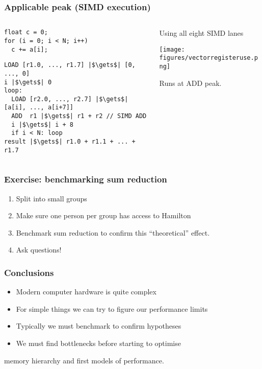 \documentclass[dvipsnames,presentation,aspectratio=169,14pt]{beamer}
\begin{document}
\begin{frame}[fragile]
  \frametitle{Applicable peak (SIMD execution)}
  \begin{columns}
    \begin{column}{0.6\textwidth}\small

\begin{verbatim}
float c = 0;
for (i = 0; i < N; i++)
  c += a[i];
\end{verbatim}


\begin{verbatim}
LOAD [r1.0, ..., r1.7] |$\gets$| [0, ..., 0]
i |$\gets$| 0
loop:
  LOAD [r2.0, ..., r2.7] |$\gets$| [a[i], ..., a[i+7]]
  ADD  r1 |$\gets$| r1 + r2 // SIMD ADD
  i |$\gets$| i + 8
  if i < N: loop
result |$\gets$| r1.0 + r1.1 + ... + r1.7
\end{verbatim}

    \end{column}
    \begin{column}{0.3\textwidth}
      Using all eight SIMD lanes

      \begin{center}
        \texttt{[image: figures/vectorregisteruse.png]}
      \end{center}

      Runs at ADD peak.
    \end{column}
  \end{columns}
\end{frame}

\begin{frame}
  \frametitle{Exercise: benchmarking sum reduction}
  \begin{enumerate}[itemsep=8pt]
    \item Split into small groups
    \item Make sure one person per group has access to Hamilton
    \item Benchmark sum reduction to confirm this ``theoretical'' effect.
    \item Ask questions!
  \end{enumerate}
\end{frame}

\begin{frame}
  \frametitle{Conclusions}
  \begin{itemize}[itemsep=11pt]
  \item Modern computer hardware is quite complex
  \item For simple things we can try to figure our performance limits
  \item Typically we must benchmark to confirm hypotheses
  \item We must find bottlenecks before starting to optimise
  \end{itemize}

  \vskip 20pt

   memory hierarchy and first models of performance.
\end{frame}
\end{document}
